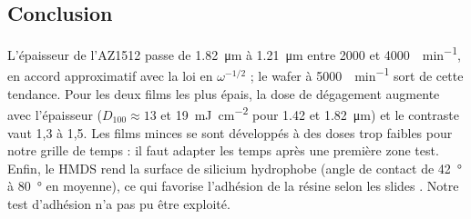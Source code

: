 \subsection{Conclusion}
L'épaisseur de l'AZ1512 passe de \qty{1,82}{\micro\metre} à \qty{1,21}{\micro\metre} entre 2000 et \qty{4000}{\tour\per\minute}, en accord approximatif avec la loi en $\omega^{-1/2}$ ; le wafer à \qty{5000}{\tour\per\minute} sort de cette tendance. Pour les deux films les plus épais, la dose de dégagement augmente avec l'épaisseur ($D_{100} \approx \num{13}$ et \qty{19}{\milli\joule\per\centi\metre\squared} pour \num{1,42} et \qty{1,82}{\micro\metre}) et le contraste vaut 1,3 à 1,5. Les films minces se sont développés à des doses trop faibles pour notre grille de temps : il faut adapter les temps après une première zone test. Enfin, le HMDS rend la surface de silicium hydrophobe (angle de contact de \qty{42}{\degree} à \qty{80}{\degree} en moyenne), ce qui favorise l'adhésion de la résine selon les slides \cite{intro}. Notre test d'adhésion n'a pas pu être exploité.
